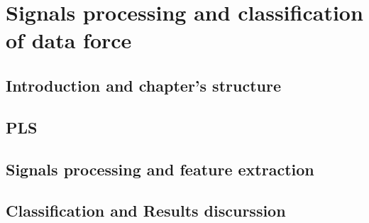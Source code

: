 \chapter{Signals processing and classification of data force}
\label{ch:forceData}

\section{Introduction and chapter's structure}

\section{PLS}

\section{Signals processing and feature extraction}


\section{Classification and Results discurssion}